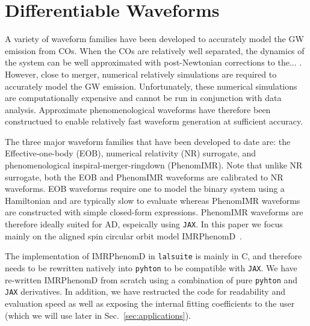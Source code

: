 \documentclass[twocolumn]{aastex631}
\newcommand{\jax}{\texttt{JAX}\xspace}
\newcommand{\lalsuite}{\texttt{lalsuite}\xspace}
\begin{document}
\section{Differentiable Waveforms}
\label{sec:waveforms}

A variety of waveform families have been developed to accurately model the GW emission from COs. 
When the COs are relatively well separated, the dynamics of the system can be well approximated with post-Newtonian corrections to the... .
However, close to merger, numerical relatively simulations are required to accurately model the GW emission.
Unfortunately, these numerical simulations are computationally expensive and cannot be run in conjunction with data analysis.
Approximate phenomenological waveforms have therefore been constructued to enable relatively fast waveform generation at sufficient accuracy.

The three major waveform families that have been developed to date are: the Effective-one-body (EOB), numerical relativity (NR) surrogate, and phenomenological inspiral-merger-ringdown (PhenomIMR).
Note that unlike NR surrogate, both the EOB and PhenomIMR waveforms are calibrated to NR waveforms.
EOB waveforms require one to model the binary system using a Hamiltonian and are typically slow to evaluate whereas PhenomIMR waveforms are constructed with simple closed-form expressions.
PhenomIMR waveforms are therefore ideally suited for AD, espeically using \jax. 
In this paper we focus mainly on the aligned spin circular orbit model IMRPhenomD~\citep{Husa:2015iqa, Khan:2015jqa}.

The implementation of IMRPhenomD in \lalsuite is mainly in C, and therefore needs to be rewritten natively into \texttt{pyhton} to be compatible with \jax.
We have re-written IMRPhenomD from scratch using a combination of pure \texttt{pyhton} and \jax derivatives.
In addition, we have restructed the code for readability and evaluation speed as well as exposing the internal fitting coefficients to the user (which we will use later in Sec.~\ref{sec:applications}).
\end{document}
